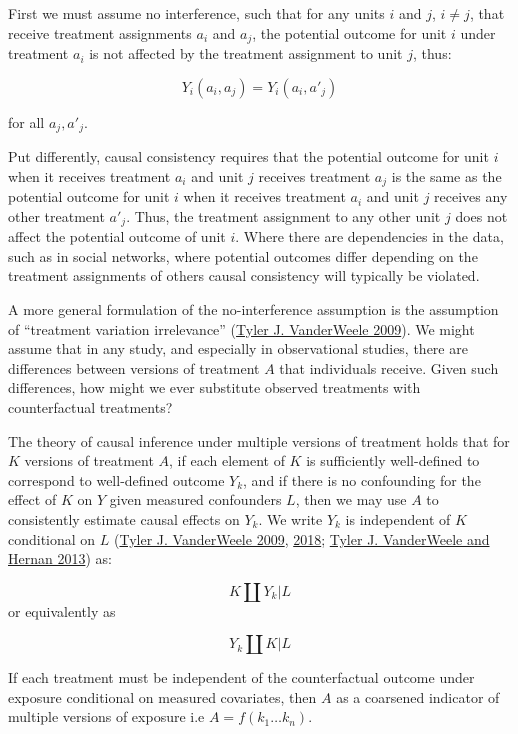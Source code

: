 \documentclass[
  singlecolumn]{report}
\begin{document}
First we must assume no interference, such that for any units \(i\) and
\(j\), \(i \neq j\), that receive treatment assignments \(a_i\) and
\(a_j\), the potential outcome for unit \(i\) under treatment \(a_i\) is
not affected by the treatment assignment to unit \(j\), thus:

\[Y_i(a_i, a_j) = Y_i(a_i, a'_j)\]

for all \(a_j, a'_j\).

Put differently, causal consistency requires that the potential outcome
for unit \(i\) when it receives treatment \(a_i\) and unit \(j\)
receives treatment \(a_j\) is the same as the potential outcome for unit
\(i\) when it receives treatment \(a_i\) and unit \(j\) receives any
other treatment \(a'_j\). Thus, the treatment assignment to any other
unit \(j\) does not affect the potential outcome of unit \(i\). Where
there are dependencies in the data, such as in social networks, where
potential outcomes differ depending on the treatment assignments of
others causal consistency will typically be violated.

A more general formulation of the no-interference assumption is the
assumption of ``treatment variation irrelevance''
(\protect\hyperlink{ref-vanderweele2009}{Tyler J. VanderWeele 2009}). We
might assume that in any study, and especially in observational studies,
there are differences between versions of treatment \(A\) that
individuals receive. Given such differences, how might we ever
substitute observed treatments with counterfactual treatments?

The theory of causal inference under multiple versions of treatment
holds that for \(K\) versions of treatment \(A\), if each element of
\(K\) is sufficiently well-defined to correspond to well-defined outcome
\(Y_k\), and if there is no confounding for the effect of \(K\) on \(Y\)
given measured confounders \(L\), then we may use \(A\) to consistently
estimate causal effects on \(Y_k\). We write \(Y_k\) is independent of
\(K\) conditional on \(L\)
(\protect\hyperlink{ref-vanderweele2009}{Tyler J. VanderWeele 2009},
\protect\hyperlink{ref-vanderweele2018}{2018};
\protect\hyperlink{ref-vanderweele2013}{Tyler J. VanderWeele and Hernan
2013}) as:

\[K \coprod Y_k | L\] or equivalently as

\[Y_k \coprod K | L\]

If each treatment must be independent of the counterfactual outcome
under exposure conditional on measured covariates, then \(A\) as a
coarsened indicator of multiple versions of exposure i.e
\(A = f(k_1\dots k_n)\).
\end{document}
